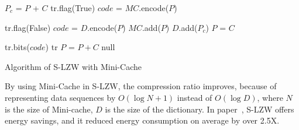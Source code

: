 \begin{algorithm}
\begin{algorithmic}[1]
\Input
\EndInput
\Output
\EndOutput

\State $P_c$ = $P$ + $C$
        \State tr.flag(True)    
        \State $code$ = $MC$.encode($P$)    
        
    \Else   {}
        \State tr.flag(False)
        \State $code$ = $D$.encode($P$)
        \State $MC$.add($P$)    
    \EndIf
    \State $D$.add($P_c$)
    \State $P$ = $C$
    
    \State tr.bits($code$)
    \State \Return tr
\Else       {}
    \State $P$ = $P+C$
    \State \Return null 
\EndIf

\end{algorithmic}
\caption{Algorithm of S-LZW with Mini-Cache}
\label{algo:S-LZW}
\end{algorithm}

By using Mini-Cache in S-LZW, the compression ratio improves, because of
representing data sequences by $O(\log N + 1)$ instead of $O(\log D)$, where $N$
is the size of Mini-cache, $D$ is the size of the dictionary. In
paper~\cite{sadler2006data}, S-LZW offers energy savings, and it reduced energy
consumption on average by over 2.5X.


